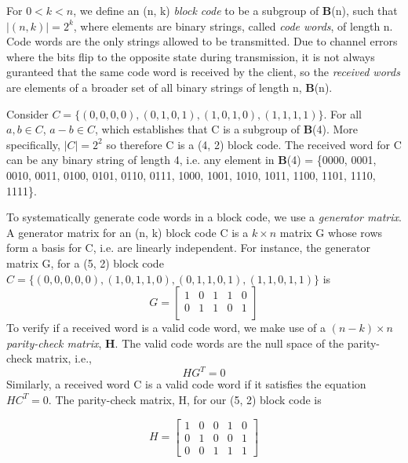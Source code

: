 \documentclass{article}
\begin{document}
For \(0 < k < n\), we define an (n, k) \textit{block code} to be a subgroup of \textbf{B}(n), such that
\(\lvert(n, k)\rvert = 2^k\), where elements are binary strings, called \textit{code words}, of 
length n. Code words are the only strings allowed to be transmitted. Due to channel errors where the 
bits flip to the opposite state during transmission, it is not always guranteed that the same code word
is received by the client, so the \textit{received words} are elements of a broader set of all binary 
strings of length n, \textbf{B}(n). 

Consider \(C = \{(0,0,0,0), (0,1,0,1), (1,0,1,0), (1,1,1,1)\}\). For all \(a, b \in C\),
\(a - b \in C\), which establishes that C is a subgroup of \textbf{B}(4). More specifically, \(|C| = 2^2\)
so therefore C is a (4, 2) block code. The received word for C can be any binary string of
length 4, i.e. any element in \textbf{B}(4) = \{0000, 0001, 0010, 0011, 0100, 0101, 0110, 0111, 1000,
1001, 1010, 1011, 1100, 1101, 1110, 1111\}.


To systematically generate code words in a block code, we use a \textit{generator matrix}. 
A generator matrix for an (n, k) block code C is a \(k \times n\) matrix G whose rows form 
a basis for C, i.e. are linearly independent. For instance, the generator matrix G, for a (5, 2)
block code \(C = \{(0,0,0,0,0), (1,0,1,1,0), (0,1,1,0,1), (1,1,0,1,1)\}\) is 
\[G = \begin{bmatrix} 
    1 & 0 & 1 & 1 & 0 \\
    0 & 1 & 1 & 0 & 1 \\
\end{bmatrix}\]
To verify if a received word is a valid code word, we make use of a \((n-k) \times n\) 
\textit{parity-check matrix}, \(\mathbf{H}\). The valid code words are the null space of the parity-check 
matrix, i.e., \[HG^T = 0\]
Similarly, a received word C is a valid code word if it satisfies the equation \( HC^T = 0 \).
The parity-check matrix, H, for our (5, 2) block code is

\[
H = \begin{bmatrix}
1 & 0 & 0 & 1 & 0 \\
0 & 1 & 0 & 0 & 1 \\
0 & 0 & 1 & 1 & 1
\end{bmatrix}\]
\end{document}
